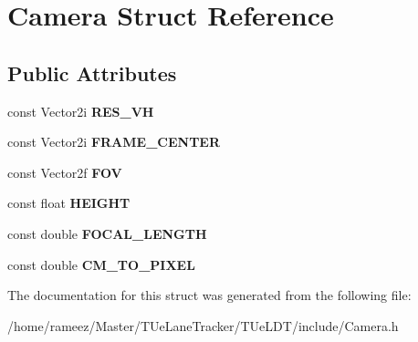 \hypertarget{structCamera}{\section{Camera Struct Reference}
\label{structCamera}
}
\subsection*{Public Attributes}
\begin{DoxyCompactItemize}
\item 
\hypertarget{structCamera_a45708ab1e843379311fd526bb4a714ee}{const Vector2i {\bfseries R\-E\-S\-\_\-\-V\-H}}\label{structCamera_a45708ab1e843379311fd526bb4a714ee}

\item 
\hypertarget{structCamera_a67776a0fb49593b5e52656ed50abe927}{const Vector2i {\bfseries F\-R\-A\-M\-E\-\_\-\-C\-E\-N\-T\-E\-R}}\label{structCamera_a67776a0fb49593b5e52656ed50abe927}

\item 
\hypertarget{structCamera_a09007a033b3e3a1788f6a768f86727ca}{const Vector2f {\bfseries F\-O\-V}}\label{structCamera_a09007a033b3e3a1788f6a768f86727ca}

\item 
\hypertarget{structCamera_ac7e16f6d0f00640b6e6b0e62f9063a9c}{const float {\bfseries H\-E\-I\-G\-H\-T}}\label{structCamera_ac7e16f6d0f00640b6e6b0e62f9063a9c}

\item 
\hypertarget{structCamera_a0c8650cb21e0055fffb14de3a9d0edb3}{const double {\bfseries F\-O\-C\-A\-L\-\_\-\-L\-E\-N\-G\-T\-H}}\label{structCamera_a0c8650cb21e0055fffb14de3a9d0edb3}

\item 
\hypertarget{structCamera_acf6a96f2ca16847f10d5df42275a99ea}{const double {\bfseries C\-M\-\_\-\-T\-O\-\_\-\-P\-I\-X\-E\-L}}\label{structCamera_acf6a96f2ca16847f10d5df42275a99ea}

\end{DoxyCompactItemize}


The documentation for this struct was generated from the following file\-:\begin{DoxyCompactItemize}
\item 
/home/rameez/\-Master/\-T\-Ue\-Lane\-Tracker/\-T\-Ue\-L\-D\-T/include/Camera.\-h\end{DoxyCompactItemize}
